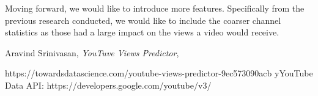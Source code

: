 \documentclass[12pt]{article}
\theoremstyle{definition}
\theoremstyle{remark}
\begin{document}
Moving forward, we would like to introduce more features. Specifically from the previous research conducted, we would like to include the coarser channel statistics as those had a large impact on the views a video would receive. 

\begin{thebibliography}{99}

 Aravind Srinivasan, \emph{YouTuve Views Predictor}, 

    \qquad https://towardsdatascience.com/youtube-views-predictor-9ec573090acb
yYouTube Data API: https://developers.google.com/youtube/v3/



\end{thebibliography}
\end{document}
